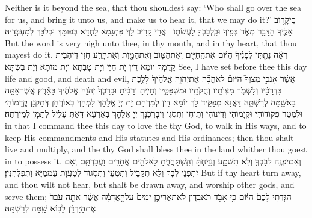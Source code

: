 {Neither is it beyond the sea, that thou shouldest say: ‘Who shall go over the sea for us, and bring it unto us, and make us to hear it, that we may do it?’}{}
{כִּֽי\maqqaf קָר֥וֹב אֵלֶ֛יךָ הַדָּבָ֖ר מְאֹ֑ד בְּפִ֥יךָ וּבִֽלְבָבְךָ֖ לַעֲשֹׂתֽוֹ׃ \setuma }
{אֲרֵי קָרִיב לָךְ פִּתְגָמָא לַחְדָּא בְּפוּמָּךְ וּבְלִבָּךְ לְמִעְבְּדֵיהּ׃}
{But the word is very nigh unto thee, in thy mouth, and in thy heart, that thou mayest do it.}{}
{רְאֵ֨ה נָתַ֤תִּי לְפָנֶ֙יךָ֙ הַיּ֔וֹם אֶת\maqqaf הַֽחַיִּ֖ים וְאֶת\maqqaf הַטּ֑וֹב וְאֶת\maqqaf הַמָּ֖וֶת וְאֶת\maqqaf הָרָֽע׃}
{חֲזִי דִּיהַבִית קֳדָמָךְ יוֹמָא דֵין יָת חַיֵּי וְיָת טָבְתָא וְיָת מוֹתָא וְיָת בִּשְׁתָּא׃}
{See, I have set before thee this day life and good, and death and evil,}{}
{אֲשֶׁ֨ר אָנֹכִ֣י מְצַוְּךָ֮ הַיּוֹם֒ לְאַהֲבָ֞ה אֶת\maqqaf יְהֹוָ֤ה אֱלֹהֶ֙יךָ֙ לָלֶ֣כֶת בִּדְרָכָ֔יו וְלִשְׁמֹ֛ר מִצְוֺתָ֥יו וְחֻקֹּתָ֖יו וּמִשְׁפָּטָ֑יו וְחָיִ֣יתָ וְרָבִ֔יתָ וּבֵֽרַכְךָ֙ יְהֹוָ֣ה אֱלֹהֶ֔יךָ בָּאָ֕רֶץ אֲשֶׁר\maqqaf אַתָּ֥ה בָא\maqqaf שָׁ֖מָּה לְרִשְׁתָּֽהּ׃}
{דַּאֲנָא מְפַקֵּיד לָךְ יוֹמָא דֵין לְמִרְחַם יָת יְיָ אֱלָהָךְ לִמְהָךְ בְּאוֹרְחָן דְּתָקְנָן קֳדָמוֹהִי וּלְמִטַּר פִּקּוֹדוֹהִי וּקְיָמוֹהִי וְדִינוֹהִי וְתֵיחֵי וְתִסְגֵּי וִיבָרְכִנָּךְ יְיָ אֱלָהָךְ בְּאַרְעָא דְּאַתְּ עָלֵיל לְתַמָּן לְמֵירְתַהּ׃}
{in that I command thee this day to love the \lord\space thy God, to walk in His ways, and to keep His commandments and His statutes and His ordinances; then thou shalt live and multiply, and the \lord\space thy God shall bless thee in the land whither thou goest in to possess it.}{}
{וְאִם\maqqaf יִפְנֶ֥ה לְבָבְךָ֖ וְלֹ֣א תִשְׁמָ֑ע וְנִדַּחְתָּ֗ וְהִֽשְׁתַּחֲוִ֛יתָ לֵאלֹהִ֥ים אֲחֵרִ֖ים וַעֲבַדְתָּֽם׃}
{וְאִם יִתְפְּנֵי לִבָּךְ וְלָא תְקַבֵּיל וְתִטְעֵי וְתִסְגּוֹד לְטָעֲוָת עַמְמַיָּא וְתִפְלְחִנִּין׃}
{But if thy heart turn away, and thou wilt not hear, but shalt be drawn away, and worship other gods, and serve them;}{}
{הִגַּ֤דְתִּי לָכֶם֙ הַיּ֔וֹם כִּ֥י אָבֹ֖ד תֹּאבֵד֑וּן לֹא\maqqaf תַאֲרִיכֻ֤ן יָמִים֙ עַל\maqqaf הָ֣אֲדָמָ֔ה אֲשֶׁ֨ר אַתָּ֤ה עֹבֵר֙ אֶת\maqqaf הַיַּרְדֵּ֔ן לָב֥וֹא שָׁ֖מָּה לְרִשְׁתָּֽהּ׃}
